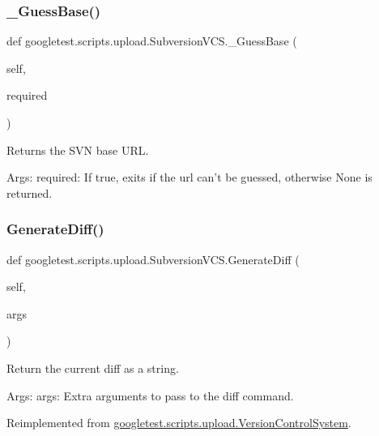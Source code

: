 \subsubsection{\texorpdfstring{\_GuessBase()}{\_GuessBase()}}
{\footnotesize\ttfamily def googletest.\+scripts.\+upload.\+Subversion\+V\+C\+S.\+\_\+\+Guess\+Base (\begin{DoxyParamCaption}\item[{}]{self,  }\item[{}]{required }\end{DoxyParamCaption})\hspace{0.3cm}{\ttfamily [private]}}

\begin{DoxyVerb}Returns the SVN base URL.

Args:
  required: If true, exits if the url can't be guessed, otherwise None is
returned.
\end{DoxyVerb}
 \mbox{\label{classgoogletest_1_1scripts_1_1upload_1_1_subversion_v_c_s_aec042415e243ba61d29c70540dcc8d87}} 
\subsubsection{\texorpdfstring{GenerateDiff()}{GenerateDiff()}}
{\footnotesize\ttfamily def googletest.\+scripts.\+upload.\+Subversion\+V\+C\+S.\+Generate\+Diff (\begin{DoxyParamCaption}\item[{}]{self,  }\item[{}]{args }\end{DoxyParamCaption})}

\begin{DoxyVerb}Return the current diff as a string.

Args:
  args: Extra arguments to pass to the diff command.
\end{DoxyVerb}
 

Reimplemented from \mbox{\hyperlink{classgoogletest_1_1scripts_1_1upload_1_1_version_control_system_aaada7d567809eca22e4a9ddd377429fe}{googletest.\+scripts.\+upload.\+Version\+Control\+System}}.

\mbox{\label{classgoogletest_1_1scripts_1_1upload_1_1_subversion_v_c_s_a1a49556f2fec864cb13543a2330a32a3}} 
